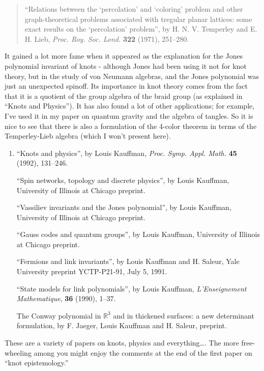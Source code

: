 \documentclass{article}
\begin{document}
\begin{quote}
``Relations between the `percolation' and `coloring' problem and other
graph-theoretical problems associated with tregular planar lattices:
some exact results on the `percolation' problem'', by H. N. V. Temperley
and E. H. Lieb, \emph{Proc. Roy. Soc. Lond.} \textbf{322} (1971),
251--280.
\end{quote}

It gained a lot more fame when it appeared as the explanation for the
Jones polynomial invariant of knots - although Jones had been using it
not for knot theory, but in the study of von Neumann algebras, and the
Jones polynomial was just an unexpected spinoff. Its importance in knot
theory comes from the fact that it is a quotient of the group algebra of
the braid group (as explained in ``Knots and Physics''). It has also
found a lot of other applications; for example, I've used it in my paper
on quantum gravity and the algebra of tangles. So it is nice to see that
there is also a formulation of the 4-color theorem in terms of the
Temperley-Lieb algebra (which I won't present here).

\begin{enumerate}
\def\labelenumi{\arabic{enumi})}
\setcounter{enumi}{1}
\item
  ``Knots and physics'', by Louis Kauffman, \emph{Proc. Symp. Appl.
  Math.} \textbf{45} (1992), 131--246.

  ``Spin networks, topology and discrete physics'', by Louis Kauffman,
  University of Illinois at Chicago preprint.

  ``Vassiliev invariants and the Jones polynomial'', by Louis Kauffman,
  University of Illinois at Chicago preprint.

  ``Gauss codes and quantum groups'', by Louis Kauffman, University of
  Illinois at Chicago preprint.

  ``Fermions and link invariants'', by Louis Kauffman and H. Saleur,
  Yale University preprint YCTP-P21-91, July 5, 1991.

  ``State models for link polynomials'', by Louis Kauffman,
  \emph{L'Enseignement Mathematique}, \textbf{36} (1990), 1--37.

  The Conway polynomial in \(\mathbb{R}^3\) and in thickened surfaces: a
  new determinant formulation, by F. Jaeger, Louis Kauffman and H.
  Saleur, preprint.
\end{enumerate}

These are a variety of papers on knots, physics and everything\ldots.
The more free-wheeling among you might enjoy the comments at the end of
the first paper on ``knot epistemology.''
\end{document}
